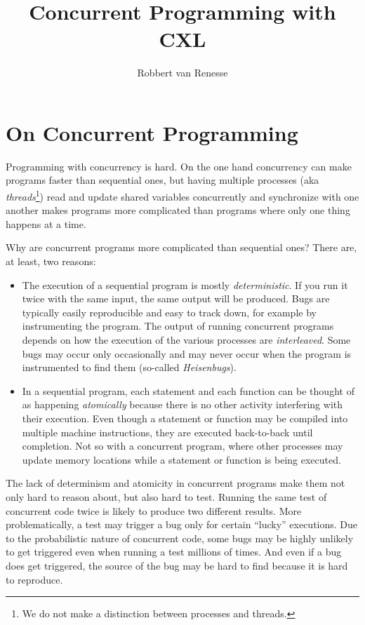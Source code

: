 \documentclass{report}
\title{Concurrent Programming with CXL}
\author{Robbert van Renesse}
\begin{document}
\maketitle
\tableofcontents

\chapter{On Concurrent Programming}

Programming with concurrency is hard.  On the one hand concurrency
can make programs faster than sequential ones, but having multiple
processes (aka \emph{threads}\footnote{We
do not make a distinction between processes and threads.})
read and update shared variables
concurrently and synchronize with one another makes programs more
complicated than programs where only one thing happens at a time.

Why are concurrent
programs more complicated than sequential ones?
There are, at least, two reasons:
\begin{itemize}
\item The execution of a sequential
program is mostly \emph{deterministic}.
If you run it twice with the same input, the same output will be produced.
Bugs are typically easily reproducible and easy to track down, for example
by instrumenting the program.
The output of running concurrent programs depends on how the
execution of the various processes are \emph{interleaved}.
Some bugs may occur only occasionally and
may never occur when the program is instrumented to find them
(so-called \emph{Heisenbugs}).
\item In a sequential program, each statement and each function can be
thought of as happening \emph{atomically}
because there is no other activity interfering with their execution.
Even though a statement or function may
be compiled into multiple machine instructions, they are executed back-to-back
until completion.  Not so with a concurrent program, where other processes
may update memory locations while a statement or function is being executed.
\end{itemize}
The lack of determinism and atomicity in concurrent programs make them
not only hard to reason about, but also hard to test.
Running the same test of concurrent code twice is likely to produce
two different results.  More problematically, a test may trigger a
bug only for certain ``lucky'' executions.  Due to the probabilistic
nature of concurrent code, some bugs may be highly unlikely to get
triggered even when running a test millions of times.  And even if
a bug does get triggered, the source of the bug may be hard to find
because it is hard to reproduce.
\end{document}

